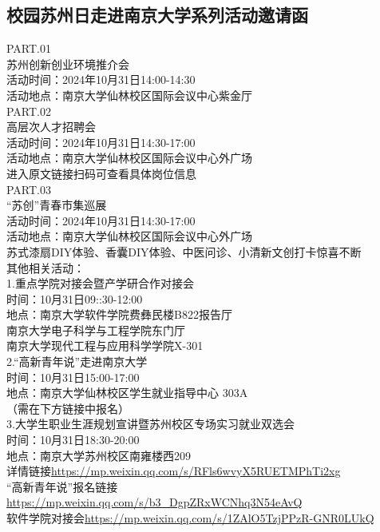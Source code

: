 \documentclass[letterpaper, 12pt]{article}
\begin{document}
\begin{multicols}{2}
\section{校园苏州日走进南京大学系列活动邀请函}
PART.01\\
苏州创新创业环境推介会\\
活动时间：2024年10月31日14:00-14:30\\
活动地点：南京大学仙林校区国际会议中心紫金厅\\
PART.02\\
高层次人才招聘会\\
活动时间：2024年10月31日14:30-17:00\\
活动地点：南京大学仙林校区国际会议中心外广场\\
进入原文链接扫码可查看具体岗位信息\\
PART.03\\
“苏创”青春市集巡展\\
活动时间：2024年10月31日14:30-17:00\\
活动地点：南京大学仙林校区国际会议中心外广场\\
苏式漆扇DIY体验、香囊DIY体验、中医问诊、小清新文创打卡惊喜不断\\
其他相关活动：\\
1.重点学院对接会暨产学研合作对接会\\
时间：10月31日09::30-12:00\\
地点：南京大学软件学院费彝民楼B822报告厅\\
南京大学电子科学与工程学院东门厅\\
南京大学现代工程与应用科学学院X-301\\
2.“高新青年说”走进南京大学\\
时间：10月31日15:00-17:00\\
地点：南京大学仙林校区学生就业指导中心 303A\\
（需在下方链接中报名）\\
3.大学生职业生涯规划宣讲暨苏州校区专场实习就业双选会\\
时间：10月31日18:30-20:00\\
地点：南京大学苏州校区南雍楼西209\\
详情链接\url{https://mp.weixin.qq.com/s/RFls6wvyX5RUETMPhTi2xg}\\
“高新青年说”报名链接\url{https://mp.weixin.qq.com/s/b3_DgpZRxWCNhq3N54eAvQ}\\
软件学院对接会\url{https://mp.weixin.qq.com/s/1ZAlO5TzjPPzR-GNR0LUkQ}\\


\end{multicols}
\end{document}
